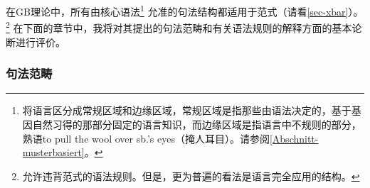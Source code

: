 在GB理论中，所有由核心语法\footnote{%
 \citet[--8]{Chomsky81a}将语言区分成常规区域和边缘区域，常规区域是指那些由语法决定的，基于基因自然习得的那部分固定的语言知识，而边缘区域是指语言中不规则的部分，\egc 熟语to pull the wool over sb.'s eyes（掩人耳目）。请参阅\ref{Abschnitt-musterbasiert}。
}
允准的句法结构都适用于\xbar 范式（请看\ref{sec-xbar}）。\footnote{%
 \citet[]{Chomsky70a} 允许违背\xbarc 范式的语法规则。但是，更为普遍的看法是语言完全应用\xbarc 的结构。
}
在下面的章节中，我将对其提出的句法范畴和有关语法规则的解释方面的基本论断进行评价。

\subsubsection{句法范畴}
\label{GB-syntaktische-categoryn}


